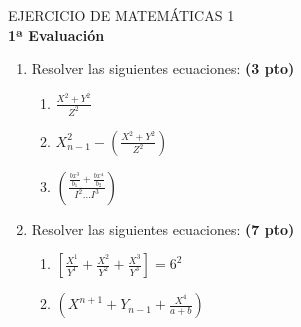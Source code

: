 \documentclass[10pt,a4paper]{article}
\begin{document}
\begin{center}
	\item \textcolor[rgb]{1,0,0}{\LARGE EJERCICIO DE MATEMÁTICAS 1}
	\vspace{2cm} \\
	{\LARGE \bf 1ª Evaluación}
\end{center}
\begin{flushleft}
	\begin{enumerate}
		\item \textcolor[rgb]{0,0,0}{Resolver las siguientes 						ecuaciones:} \textcolor [rgb]{0,0,1}{\bf (3 pto)}
			\begin{enumerate}
				\item $\frac{X^2+Y^2}{Z^2}$
				\item $X^2_{n-1}-(\frac{X^2+Y^2}						{Z^2})$
				\item $(\frac{\frac{bx^3}{b_1}+							{\frac{bx^4}{b_2}}} 								{I^2...I^3})$
			\end{enumerate}
		\item \textcolor[rgb]{0,0,0}{Resolver las siguientes 						ecuaciones:} \textcolor [rgb]{0,0,1}{\bf (7 pto)}
			\begin{enumerate}
				\item $[{\frac{X^1}{Y^1}+			{\frac{X^2}{Y^2}}+{\frac{X^3}{Y^3}}}] = 6^2$
				\item $(X^{n+1}+Y_{n-1}+{\frac{X^4}{a+b}})$
			\end{enumerate}
	\end{enumerate}
\end{flushleft}
\end{document}
